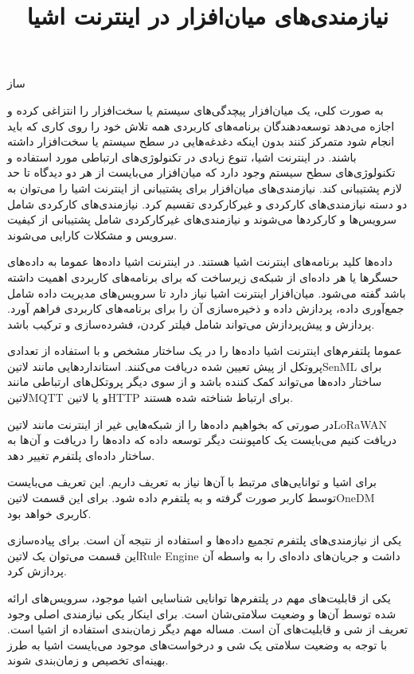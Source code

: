 \documentclass[]{./reports}
\title{نیازمندی‌های میان‌افزار در اینترنت اشیا}
\begin{document}
‌ساز

به صورت کلی، یک میان‌افزار پیچدگی‌های سیستم یا سخت‌افزار را انتزاغی کرده و اجازه می‌دهد
توسعه‌دهندگان برنامه‌های کاربردی همه تلاش خود را روی کاری که باید انجام شود متمرکز کنند بدون
اینکه دغدغه‌هایی در سطح سیستم یا سخت‌افزار داشته باشند.
در اینترنت اشیا، تنوع زیادی در تکنولوژی‌های ارتباطی مورد استفاده و تکنولوژی‌های سطح سیستم وجود دارد که
میان‌افزار می‌بایست از هر دو دیدگاه تا حد لازم پشتیبانی کند.
نیازمندی‌های میان‌افزار برای پشتیبانی از اینترنت اشیا را می‌توان به دو دسته نیازمندی‌های کارکردی و غیرکارکردی تقسیم کرد.
نیازمندی‌های کارکردی شامل سرویس‌ها و کارکردها می‌شوند و نیازمندی‌های غیرکارکردی شامل پشتیبانی از کیفیت سرویس
و مشکلات کارایی می‌شوند.


داده‌ها کلید برنامه‌های اینترنت اشیا هستند. در اینترنت اشیا داده‌ها عموما به داده‌های حسگرها
یا هر داده‌ای از شبکه‌ی زیرساخت که برای برنامه‌های کاربردی اهمیت داشته باشد گفته می‌شود.
میان‌افزار اینترنت اشیا نیاز دارد تا سرویس‌های مدیریت داده شامل جمع‌آوری داده، پردازش داده و ذخیره‌سازی
آن را برای برنامه‌های کاربردی فراهم آورد.
پردازش و پیش‌پردازش می‌تواند شامل فیلتر کردن، فشرده‌سازی و ترکیب باشد.


عموما پلتفرم‌های اینترنت اشیا داده‌ها را در یک ساختار مشخص
و با استفاده از تعدادی پروتکل از پیش تعیین شده دریافت می‌کنند.
استانداردهایی مانند ‌لاتین{SenML} برای ساختار داده‌ها می‌تواند
کمک کننده باشد و از سوی دیگر پروتکل‌های ارتباطی مانند ‌لاتین{MQTT}
و یا ‌لاتین{HTTP} برای ارتباط شناخته شده هستند.

در صورتی که بخواهیم داده‌ها را از شبکه‌هایی غیر از اینترنت مانند ‌لاتین{LoRaWAN}
دریافت کنیم می‌بایست یک کامپوننت دیگر توسعه داده که داده‌ها را دریافت و آن‌ها به ساختار
داده‌ای پلتفرم تغییر دهد.


برای اشیا و توانایی‌های مرتبط با آن‌ها نیاز به تعریف داریم. این تعریف می‌بایست توسط کاربر صورت
گرفته و به پلتفرم داده شود. برای این قسمت ‌لاتین{OneDM} کاربری خواهد بود.


یکی از نیازمندی‌های پلتفرم تجمیع داده‌ها و استفاده از نتیجه آن است.
برای پیاده‌سازی این قسمت می‌توان یک ‌لاتین{Rule Engine} داشت و جریان‌های داده‌ای
را به واسطه آن پردازش کرد.


یکی از قابلیت‌های مهم در پلتفرم‌ها توانایی شناسایی اشیا موجود، سرویس‌های ارائه شده توسط آن‌ها و وضعیت سلامتی‌شان است.
برای اینکار یکی نیازمندی اصلی وجود تعریف از شی و قابلیت‌های آن است.
مساله مهم دیگر زمان‌بندی استفاده از اشیا است. با توجه به وضعیت سلامتی یک شی و درخواست‌های موجود می‌بایست اشیا
به طرز بهینه‌ای تخصیص و زمان‌بندی شوند.
\end{document}
